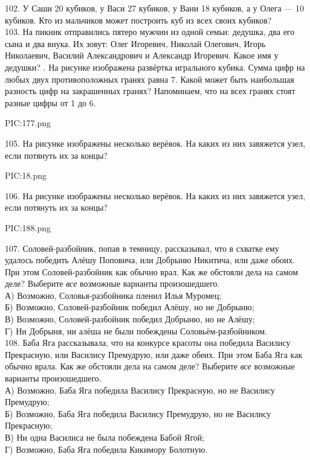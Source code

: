102. У Саши 20 кубиков, у Васи 27 кубиков, у Вани 18 кубиков, а у Олега --- 10 кубиков. Кто из мальчиков может построить куб из всех своих кубиков?\\
103. На пикник отправились пятеро мужчин из одной семьи: дедушка, два его сына и два внука. Их зовут: Олег Игоревич, Николай Олегович, Игорь Николаевич, Василий Александрович и Александр Игоревич. Какое имя у дедушки?\newpage
{}. На рисунке изображена развёртка игрального кубика. Сумма цифр на любых двух противоположных гранях равна 7. Какой может быть наибольшая разность цифр на закрашенных гранях? Напоминаем, что на всех гранях стоят разные цифры от 1 до 6.
\begin{center}
{{PIC:177.png}}
\end{center}
105. На рисунке изображены несколько верёвок. На каких из них завяжется узел, если потянуть их за концы?
\begin{center}
{{PIC:18.png}}
\end{center}
106. На рисунке изображены несколько верёвок. На каких из них завяжется узел, если потянуть их за концы?
\begin{center}
{{PIC:188.png}}
\end{center}
107. Соловей-разбойник, попав в темницу, рассказывал, что в схватке ему удалось победить Алёшу Поповича, или Добрыню Никитича, или даже обоих. При этом Соловей-разбойник как обычно врал. Как же обстояли дела на самом деле? Выберите {\it все} возможные варианты произошедшего.\\
А) Возможно, Соловья-разбойника пленил Илья Муромец;\\
Б) Возможно, Соловей-разбойник победил Алёшу, но не Добрыню;\\
В) Возможно, Соловей-разбойник победил Добрыню, но не Алёшу;\\
Г) Ни Добрыня, ни алёша не были побеждены Соловьём-разбойником.\\
108. Баба Яга рассказывала, что на конкурсе красоты она победила Василису Прекрасную, или Василису Премудрую, или даже обеих. При этом Баба Яга как обычно врала. Как же обстояли дела на самом деле? Выберите {\it все} возможные варианты произошедшего.\\
А) Возможно, Баба Яга победила Василису Прекрасную, но не Василису Премудрую;\\
Б) Возможно, Баба Яга победила Василису Премудрую, но не Василису Прекрасную;\\
В) Ни одна Василиса не была побеждена Бабой Ягой;\\
Г) Возможно, Баба Яга победила Кикимору Болотную.\\
